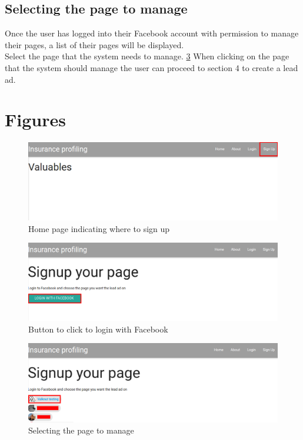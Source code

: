 \documentclass{article}
\begin{document}
		\subsection{Selecting the page to manage}
			Once the user has logged into their Facebook account with permission to manage their pages, a list of their pages will be displayed.\\
			Select the page that the system needs to manage.
			\ref{fig:selectPage}
			When clicking on the page that the system should manage the user can proceed to section 4 to create a lead ad.

	\section{Figures}
		\begin{figure}[H]
		  \centering
		      \includegraphics[width=\textwidth]{images/home_signup.png}
		  \caption{Home page indicating where to sign up}
		  \label{fig:homeSignup}
		\end{figure}

		\begin{figure}[H]
		  \centering
		      \includegraphics[width=\textwidth]{images/signup_login.png}
		  \caption{Button to click to login with Facebook}
		  \label{fig:signupLogin}
		\end{figure}

		\begin{figure}[H]
		  \centering
		      \includegraphics[width=\textwidth]{images/select_page.png}
		  \caption{Selecting the page to manage}
		  \label{fig:selectPage}
		\end{figure}
\end{document}
